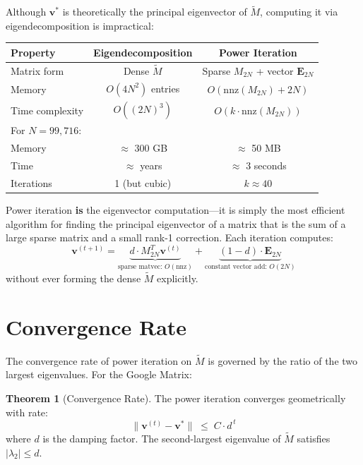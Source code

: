 \documentclass[11pt,a4paper]{article}
\theoremstyle{definition}
\newtheorem{theorem}{Theorem}
\begin{document}
Although $\bm{v}^*$ is theoretically the principal eigenvector of
$\widetilde{M}$, computing it via eigendecomposition is impractical:

\begin{center}
\renewcommand{\arraystretch}{1.3}
\begin{tabular}{lcc}
\hline
\textbf{Property} & \textbf{Eigendecomposition} & \textbf{Power Iteration} \\
\hline
Matrix form & Dense $\widetilde{M}$ & Sparse $M_{2N}$ + vector $\bm{E}_{2N}$ \\
Memory & $O(4N^2)$ entries & $O(\text{nnz}(M_{2N}) + 2N)$ \\
Time complexity & $O((2N)^3)$ & $O(k \cdot \text{nnz}(M_{2N}))$ \\
\hline
\multicolumn{3}{l}{\small For $N = 99{,}716$:} \\
Memory & $\approx$ 300 GB & $\approx$ 50 MB \\
Time & $\approx$ years & $\approx$ 3 seconds \\
Iterations & 1 (but cubic) & $k \approx 40$ \\
\hline
\end{tabular}
\end{center}

\begin{tcolorbox}[colback=blue!5,colframe=darkblue,title=Key Insight]
Power iteration \textbf{is} the eigenvector computation---it is simply the
most efficient algorithm for finding the principal eigenvector of a matrix
that is the sum of a large sparse matrix and a small rank-1 correction.
Each iteration computes:
\[
\bm{v}^{(t+1)} = \underbrace{d \cdot M_{2N}^T \bm{v}^{(t)}}_{\text{sparse
matvec: } O(\text{nnz})} + \underbrace{(1-d) \cdot
\bm{E}_{2N}}_{\text{constant vector add: } O(2N)}
\]
without ever forming the dense $\widetilde{M}$ explicitly.
\end{tcolorbox}

\section{Convergence Rate}

The convergence rate of power iteration on $\widetilde{M}$ is governed by
the ratio of the two largest eigenvalues.  For the Google Matrix:

\begin{theorem}[{Convergence Rate}]
The power iteration converges geometrically with rate:
\[
\|\bm{v}^{(t)} - \bm{v}^*\| \;\leq\; C \cdot d^{\,t}
\]
where $d$ is the damping factor.  The second-largest eigenvalue of
$\widetilde{M}$ satisfies $|\lambda_2| \leq d$.
\end{theorem}
\end{document}
